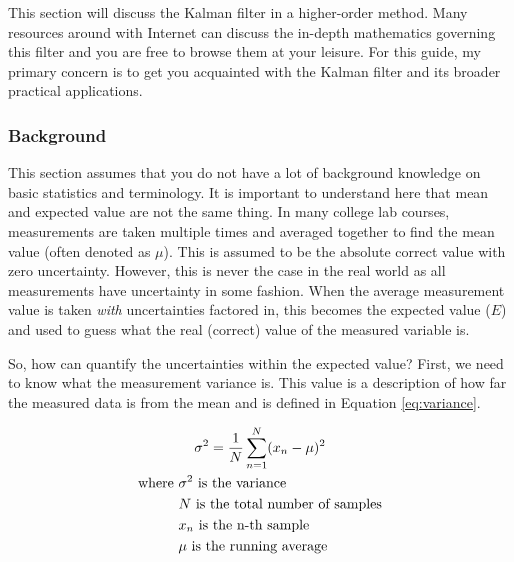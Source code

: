         This section will discuss the Kalman filter in a higher-order method.
        Many resources around with Internet can discuss the in-depth mathematics governing this filter and you are free to browse them at your leisure. 
        For this guide, my primary concern is to get you acquainted with the Kalman filter and its broader practical applications.
        
        \subsubsection*{Background} This section assumes that you do not have a lot of background knowledge on basic statistics and terminology.
        It is important to understand here that mean and expected value are not the same thing.
        In many college lab courses, measurements are taken multiple times and averaged together to find the mean value (often denoted as $\mu$).
        This is assumed to be the absolute correct value with zero uncertainty.
        However, this is never the case in the real world as all measurements have uncertainty in some fashion.
        When the average measurement value is taken \textit{with} uncertainties factored in, this becomes the expected value ($E$) and used to guess what the real (correct) value of the measured variable is.

        So, how can quantify the uncertainties within the expected value? First, we need to know what the measurement variance is.
        This value is a description of how far the measured data is from the mean and is defined in Equation \ref{eq:variance}. 

        
        \begin{gather} \labeq{variance}
            \sigma^2 = \frac{1}{N} \sum_{n=1}^{N} (x_n - \mu)^2 \\ 
            \begin{aligned}
                \text{where } &\sigma^2 \text{ is the variance} \\
                &N \text{ is the total number of samples} \\
                &x_n \text{ is the n-th sample} \\
                &\mu \text{ is the running average}
            \end{aligned} \notag
        \end{gather}

